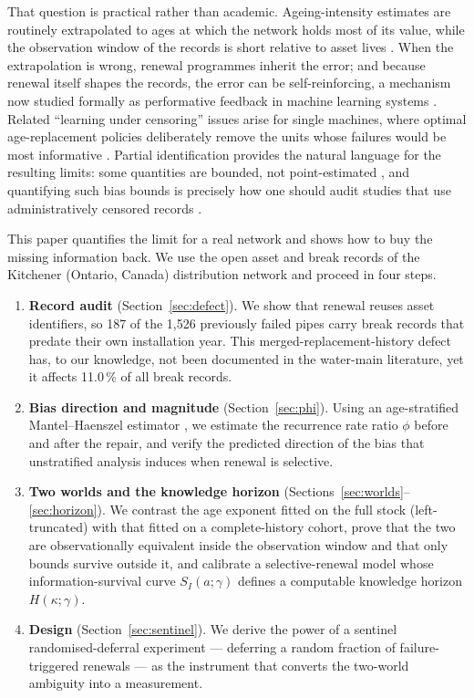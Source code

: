 \documentclass[review,12pt,authoryear]{elsarticle}
\begin{document}
That question is practical rather than academic. Ageing-intensity estimates
are routinely extrapolated to ages at which the network holds most of its
value, while the observation window of the records is short relative to
asset lives \citep{Renaud2014,LeGat2013b}. When the extrapolation is wrong,
renewal programmes inherit the error; and because renewal itself shapes the
records, the error can be self-reinforcing, a mechanism now studied
formally as performative feedback in machine learning systems
\citep{Hardt2025}. Related ``learning under censoring'' issues arise for
single machines, where optimal age-replacement policies deliberately remove
the units whose failures would be most informative
\citep{BarlowProschan1965,Drent2020}. Partial identification provides the
natural language for the resulting limits: some quantities are bounded, not
point-estimated \citep{Manski2003,Tamer2010}, and quantifying such bias
bounds is precisely how one should audit studies that use administratively
censored records \citep{Bartlett2014}.

This paper quantifies the limit for a real network and shows how to buy the
missing information back. We use the open asset and break records of the
Kitchener (Ontario, Canada) distribution network and proceed in four steps.

\begin{enumerate}
\item \textbf{Record audit} (Section~\ref{sec:defect}). We show that renewal
reuses asset identifiers, so 187 of the 1,526 previously failed
pipes carry break records that predate their own installation year. This
merged-replacement-history defect has, to our knowledge, not been documented
in the water-main literature, yet it affects 11.0\,\% of all break
records.
\item \textbf{Bias direction and magnitude} (Section~\ref{sec:phi}). Using
an age-stratified Mantel--Haenszel estimator \citep{Mantel1959}, we estimate
the recurrence rate ratio $\phi$ before and after the repair, and verify the
predicted direction of the bias that unstratified analysis induces when
renewal is selective.
\item \textbf{Two worlds and the knowledge horizon}
(Sections~\ref{sec:worlds}--\ref{sec:horizon}). We contrast the age exponent
fitted on the full stock (left-truncated) with that fitted on a
complete-history cohort, prove that the two are observationally equivalent
inside the observation window and that only bounds survive outside it, and
calibrate a selective-renewal model whose information-survival curve
$S_I(a;\gamma)$ defines a computable knowledge horizon $H(\kappa;\gamma)$.
\item \textbf{Design} (Section~\ref{sec:sentinel}). We derive the power of a
sentinel randomised-deferral experiment --- deferring a random fraction of
failure-triggered renewals --- as the instrument that converts the
two-world ambiguity into a measurement.
\end{enumerate}
\end{document}
